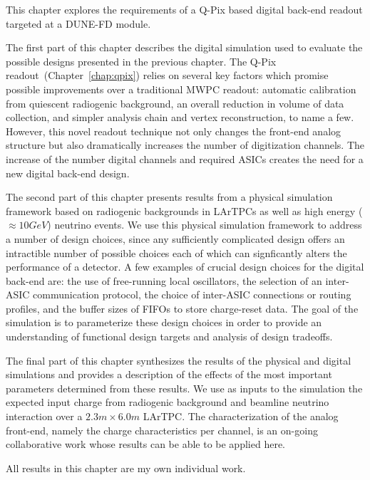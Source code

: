 This chapter explores the requirements of a Q-Pix based digital back-end readout targeted at a DUNE-FD module.

The first part of this chapter describes the digital simulation used to evaluate the possible designs presented in the previous chapter.
The Q-Pix readout~(Chapter~\ref{chap:qpix}) relies on several key factors which promise possible improvements over a traditional MWPC readout: automatic calibration from quiescent radiogenic background, an overall reduction in volume of data collection, and simpler analysis chain and vertex reconstruction, to name a few.
However, this novel readout technique not only changes the front-end analog structure but also dramatically increases the number of digitization channels.
The increase of the number digital channels and required ASICs creates the need for a new digital back-end design.

The second part of this chapter presents results from a physical simulation framework based on radiogenic backgrounds in LArTPCs as well as high energy ($\approx 10\unit{GeV}$) neutrino events.
We use this physical simulation framework to address a number of design choices, since any sufficiently complicated design offers an intractible number of possible choices each of which can signficantly alters the performance of a detector.
A few examples of crucial design choices for the digital back-end are: the use of free-running local oscillators, the selection of an inter-ASIC communication protocol, the choice of inter-ASIC connections or routing profiles, and the buffer sizes of FIFOs to store charge-reset data.
The goal of the simulation is to parameterize these design choices in order to provide an understanding of functional design targets and analysis of design tradeoffs.

The final part of this chapter synthesizes the results of the physical and digital simulations and provides a description of the effects of the most important parameters determined from these results.
We use as inputs to the simulation the expected input charge from radiogenic background and beamline neutrino interaction over a $2.3 \unit{m} \times 6.0 \unit{m}$ LArTPC.
The characterization of the analog front-end, namely the charge characteristics per channel, is an on-going collaborative work whose results can be able to be applied here.

All results in this chapter are my own individual work.







